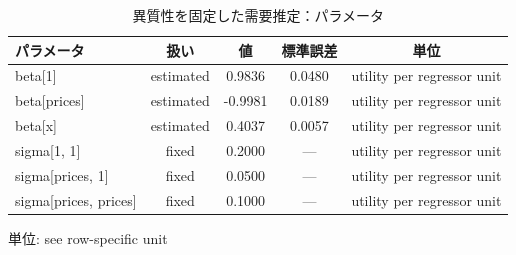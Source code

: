 \begingroup
\begin{table}[htbp]
\centering
\caption{異質性を固定した需要推定：パラメータ}
\label{tab:specialist-blp-fixed-r01-displays-parameters}
\begin{tabular}{lcccc}
\toprule
パラメータ & 扱い & 値 & 標準誤差 & 単位 \\
\midrule
beta[1] & estimated & 0.9836 & 0.0480 & utility per regressor unit \\
beta[prices] & estimated & -0.9981 & 0.0189 & utility per regressor unit \\
beta[x] & estimated & 0.4037 & 0.0057 & utility per regressor unit \\
sigma[1, 1] & fixed & 0.2000 & — & utility per regressor unit \\
sigma[prices, 1] & fixed & 0.0500 & — & utility per regressor unit \\
sigma[prices, prices] & fixed & 0.1000 & — & utility per regressor unit \\
\bottomrule
\end{tabular}
\par\medskip\begin{minipage}{\linewidth}\footnotesize
単位: see row-specific unit
\end{minipage}
\end{table}
\endgroup
